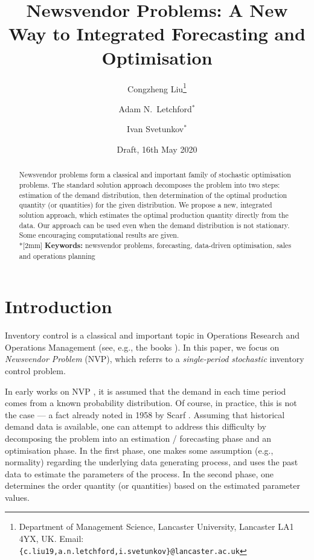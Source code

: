\documentclass{article}
\title{Newsvendor Problems: A New Way to Integrated Forecasting and Optimisation}
\author{Congzheng Liu\thanks{Department of Management Science,
Lancaster University, Lancaster LA1 4YX, UK.
Email: {\tt \{c.liu19,a.n.letchford,i.svetunkov\}@lancaster.ac.uk}}
\and Adam N.\ Letchford$^*$ \and Ivan Svetunkov$^*$} %
\date{Draft, 16th May 2020}
\begin{document}
\maketitle

\begin{abstract}
Newsvendor problems form a classical and important family of stochastic optimisation problems. The standard solution approach decomposes the problem into two steps: estimation of the demand distribution, then determination of the optimal production quantity (or quantities) for the given distribution. We propose a new, integrated solution approach, which estimates the optimal production quantity directly from the data. Our approach can be used even when the demand distribution is not stationary. Some encouraging computational results are given. 
\\*[2mm]
{\bf Keywords:} newsvendor problems, forecasting, data-driven optimisation, sales and operations planning
\end{abstract}


\section{Introduction}

Inventory control is a classical and important topic in Operations Research and Operations Management (see, e.g., the books \cite{Po02,SPP98,Zi00}). In this paper, we focus on \emph{Newsvendor Problem} (NVP), which referrs to a \emph{single-period} \emph{stochastic} inventory control problem.

In early works on NVP \cite{AHM51,MK51}, it is assumed that the demand in each time period comes from a known probability distribution. Of course, in practice, this is not the case --- a fact already noted in 1958 by Scarf \cite{Sc58}. Assuming that historical demand data is available, one can attempt to address this difficulty by decomposing the problem into an estimation / forecasting phase and an optimisation phase.
In the first phase, one makes some assumption (e.g., normality) regarding the underlying data generating process, and uses the past data to estimate the parameters of the process.
In the second phase, one determines the order quantity (or quantities) based on the estimated parameter values.
\end{document}
